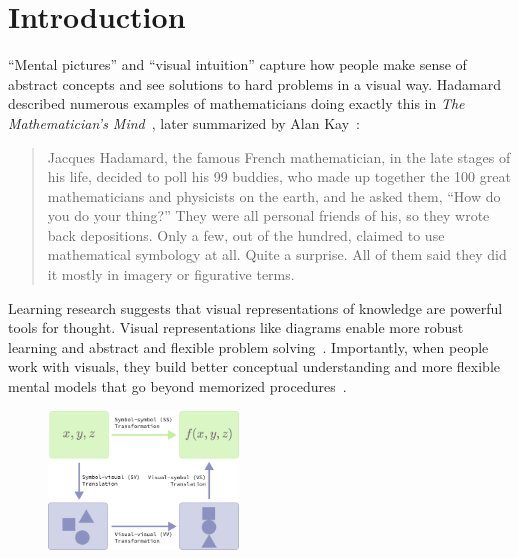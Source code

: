 \chapter{Introduction}

``Mental pictures'' and ``visual intuition'' capture how people make sense of abstract concepts and see solutions to hard problems in a visual way. Hadamard described numerous examples of mathematicians doing exactly this in \emph{The Mathematician's Mind}~\cite{Hadamard1997a}, later summarized by Alan Kay~\cite{doingWithImages}:

\begin{quote}
Jacques Hadamard, the famous French mathematician, in the late stages of his life, decided to poll his 99 buddies, who made up together the 100 great mathematicians and physicists on the earth, and he asked them, ``How do you do your thing?'' They were all personal friends of his, so they wrote back depositions. Only a few, out of the hundred, claimed to use mathematical symbology at all. Quite a surprise. All of them said they did it mostly in imagery or figurative terms.
\end{quote}

Learning research suggests that visual representations of knowledge are powerful tools for thought. Visual representations like diagrams enable more robust learning \cite{multimediaLearning} and abstract and flexible problem solving~\cite{Koedinger1990a, pictureAlgebra, DiagramsThousandWords}. Importantly, when people work with visuals, they build better conceptual understanding and more flexible mental models that go beyond memorized procedures~\cite{multipleReps}.

\setlength{\columnsep}{1em}
\setlength{\intextsep}{0em}
\begin{figure}
\vspace{-10pt}
  \begin{center}
    \includegraphics[width=0.45\textwidth]{assets/chapter-1/grounding-rectangle.pdf}
  \end{center}
\end{figure}

